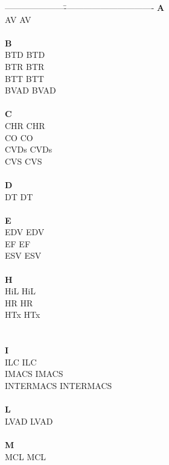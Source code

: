 \begin{tabbing}
  ---------------------\=--------------------------------\kill
  \textbf{A}\\
\acs{AV}       \> \acl{AV} \\
\\
\textbf{B}\\
\acs{BTD}       \> \acl{BTD} \\
\acs{BTR}       \> \acl{BTR} \\
\acs{BTT}       \> \acl{BTT} \\
\acs{BVAD}       \> \acl{BVAD} \\
\\
\textbf{C}\\
\acs{CHR}       \> \acl{CHR} \\
\acs{CO}       \> \acl{CO} \\
\acs{CVDs}       \> \acl{CVDs} \\
\acs{CVS}       \> \acl{CVS} \\
\\
\textbf{D}\\
\acs{DT}       \> \acl{DT} \\
\\
\textbf{E}\\
\acs{EDV}       \> \acl{EDV} \\
\acs{EF}       \> \acl{EF} \\
\acs{ESV}       \> \acl{ESV} \\
\\
\textbf{H}\\
\acs{HiL}       \> \acl{HiL} \\
\acs{HR}       \> \acl{HR} \\
\acs{HTx}       \> \acl{HTx} \\
\\
\\
\pagebreak
\textbf{I}\\
\acs{ILC}       \> \acl{ILC} \\
\acs{IMACS}       \> \acl{IMACS}\\
\acs{INTERMACS}       \> \acl{INTERMACS}\\
\\
\textbf{L}\\
\acs{LVAD}       \> \acl{LVAD} \\
\\
\textbf{M}\\
\acs{MCL}       \> \acl{MCL} \\

\end{tabbing}
